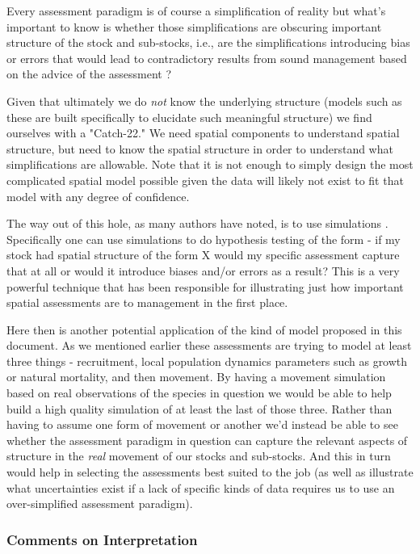 \documentclass[11pt]{article}
\begin{document}
Every assessment paradigm is of course a simplification of reality but what's important to know is whether those simplifications are obscuring important structure of the stock and sub-stocks, i.e., are the simplifications introducing bias or errors that would lead to contradictory results from sound management based on the advice of the assessment \citep{cadrin2020}? 

Given that ultimately we do \textit{not} know the underlying structure (models such as these are built specifically to elucidate such meaningful structure) we find ourselves with a "Catch-22." We need spatial components to understand spatial structure, but need to know the spatial structure in order to understand what simplifications are allowable. Note that it is not enough to simply design the most complicated spatial model possible given the data will likely not exist to fit that model with any degree of confidence. 

The way out of this hole, as many authors have noted, is to use simulations \citep{cadrin2020} \citep{goethel2023}. Specifically one can use simulations to do hypothesis testing of the form - if my stock had spatial structure of the form X would my specific assessment capture that at all or would it introduce biases and/or errors as a result? This is a very powerful technique that has been responsible for illustrating just how important spatial assessments are to management in the first place.\newline

Here then is another potential application of the kind of model proposed in this document. As we mentioned earlier these assessments are trying to model at least three things - recruitment, local population dynamics parameters such as growth or natural mortality, and then movement. By having a movement simulation based on real observations of the species in question we would be able to help build a high quality simulation of at least the last of those three. Rather than having to assume one form of movement or another we'd instead be able to see whether the assessment paradigm in question can capture the relevant aspects of structure in the \textit{real} movement of our stocks and sub-stocks. And this in turn would help in selecting the assessments best suited to the job (as well as illustrate what uncertainties exist if a lack of specific kinds of data requires us to use an over-simplified assessment paradigm). 

\subsubsection{Comments on Interpretation}
\end{document}
